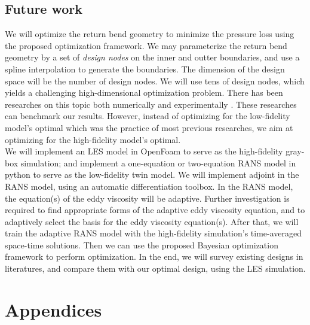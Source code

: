 \documentclass[a4paper,onecolumn]{article}
\theoremstyle{remark}
\begin{document}
\subsection{Future work}
\noindent We will optimize the return bend geometry to minimize the pressure loss using the
proposed optimization framework. We may parameterize the return bend
geometry by a set of \emph{design nodes} on the inner and outter boundaries, 
and use a spline interpolation to generate the
boundaries. The dimension of the design space will be the number of design nodes.
We will use tens of design nodes, which yields a challenging high-dimensional optimization problem.
There has been researches on this topic both numerically and experimentally
\cite{ubend rans opt 1, ubend rans opt 2}. These researches can benchmark our results.
However, instead of optimizing for the low-fidelity model's
optimal which was the practice of most previous researches,
we aim at optimizing for the high-fidelity model's optimal.\\

\noindent We will implement an LES model in OpenFoam to serve as the high-fidelity gray-box 
simulation; and implement a one-equation or two-equation RANS model in python to
serve as the low-fidelity twin model. We will implement adjoint in the RANS model, using
an automatic differentiation toolbox.
In the RANS model, the equation(s) of the eddy viscosity will be adaptive.
Further investigation is required to find appropriate forms of the adaptive 
eddy viscosity equation, and to adaptively select the basis for the eddy viscosity equation(s). 
After that, we will train the adaptive RANS model with the high-fidelity simulation's time-averaged 
space-time solutions. Then we can use the proposed Bayesian optimization framework 
to perform optimization. In the end, 
we will survey existing designs in literatures, and compare them with
our optimal design, using the LES simulation.\\



\newpage
\section{Appendices}
\end{document}
